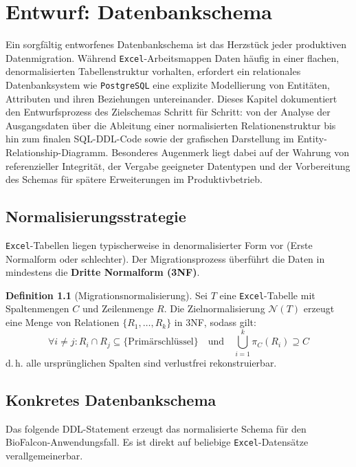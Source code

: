 ﻿\documentclass[12pt,a4paper]{report}
\theoremstyle{definition}
\newtheorem{definition}{Definition}[section]
\theoremstyle{remark}
\newcommand{\excel}{\texttt{Excel}}
\newcommand{\pg}{\texttt{PostgreSQL}}
\begin{document}
\chapter{Entwurf: Datenbankschema}

Ein sorgfältig entworfenes Datenbankschema ist das Herzstück jeder produktiven Datenmigration. Während \excel{}-Arbeitsmappen Daten häufig in einer flachen, denormalisierten Tabellenstruktur vorhalten, erfordert ein relationales Datenbanksystem wie \pg{} eine explizite Modellierung von Entitäten, Attributen und ihren Beziehungen untereinander. Dieses Kapitel dokumentiert den Entwurfsprozess des Zielschemas Schritt für Schritt: von der Analyse der Ausgangsdaten über die Ableitung einer normalisierten Relationenstruktur bis hin zum finalen SQL-DDL-Code sowie der grafischen Darstellung im Entity-Relationship-Diagramm. Besonderes Augenmerk liegt dabei auf der Wahrung von referenzieller Integrität, der Vergabe geeigneter Datentypen und der Vorbereitung des Schemas für spätere Erweiterungen im Produktivbetrieb.

\section{Normalisierungsstrategie}
\excel-Tabellen liegen typischerweise in denormalisierter Form vor
(Erste Normalform oder schlechter). Der Migrationsprozess überführt
die Daten in mindestens die \textbf{Dritte Normalform (3NF)}.

\begin{definition}[Migrationsnormalisierung]
  Sei $T$ eine \excel-Tabelle mit Spaltenmengen $C$ und Zeilenmenge $R$.
  Die Zielnormalisierung $\mathcal{N}(T)$ erzeugt eine Menge von
  Relationen $\{R_1, \ldots, R_k\}$ in 3NF, sodass gilt:
  \[
    \forall i \neq j: R_i \cap R_j \subseteq \{\text{Primärschlüssel}\}
    \quad\text{und}\quad
    \bigcup_{i=1}^{k} \pi_{C}(R_i) \supseteq C
  \]
  d.\,h. alle ursprünglichen Spalten sind verlustfrei rekonstruierbar.
\end{definition}

\section{Konkretes Datenbankschema}

Das folgende DDL-Statement erzeugt das normalisierte Schema für den
BioFalcon-Anwen\-dungsfall. Es ist direkt auf beliebige \excel-Datensätze
verallgemeinerbar.
\end{document}
